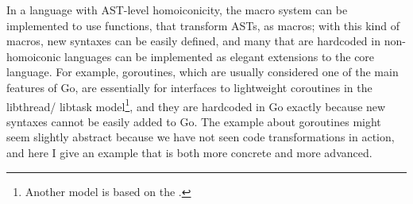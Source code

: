 In a language with AST-level homoiconicity, the macro system can be implemented
to use functions, that transform ASTs, as macros; with this kind of macros, new
syntaxes can be easily defined, and many  that are
hardcoded in non-homoiconic languages can be implemented as elegant extensions
to the core language.  For example, goroutines, which are usually considered
one of the main features of Go, are essentially  for
interfaces to lightweight coroutines in the libthread/%
libtask model\footnote{\label{fn:cps}Another model is
based on the .}, and
they are hardcoded in Go exactly because new syntaxes cannot be easily added
to Go.  The example about goroutines might seem slightly abstract because
we have not seen code transformations in action, and here I give
an example that is both more concrete and more advanced.

